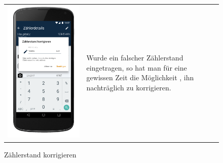 \begin{figure}[h]
\begin{tabularx}{\textwidth}{X  X}
	\includegraphics[scale = 0.155]{img/AndroidMockup/correct} \caption{Zählerstand korrigieren} & Wurde ein falscher Zählerstand eingetragen, so hat man für eine gewissen Zeit die Möglichkeit , ihn nachträglich zu korrigieren.\\ 
\end{tabularx}
\end{figure}

